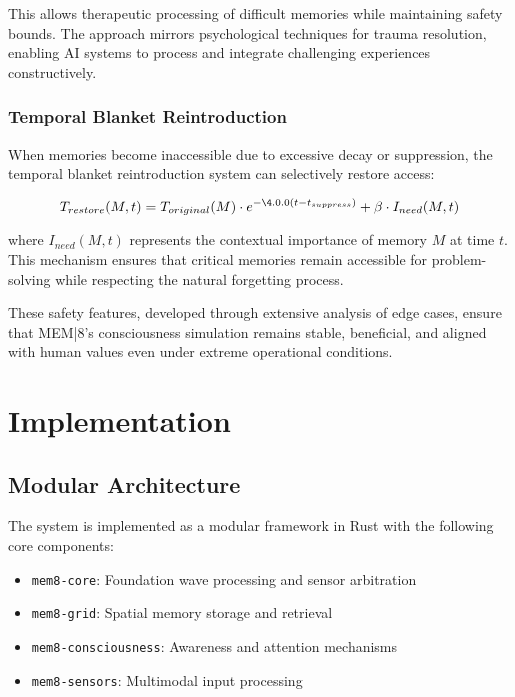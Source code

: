 \documentclass[11pt,letterpaper]{article}
\begin{document}
This allows therapeutic processing of difficult memories while maintaining safety bounds. The approach mirrors psychological techniques for trauma resolution, enabling AI systems to process and integrate challenging experiences constructively.

\subsubsection{Temporal Blanket Reintroduction}

When memories become inaccessible due to excessive decay or suppression, the temporal blanket reintroduction system can selectively restore access:

\begin{equation}
T_{restore}(M, t) = T_{original}(M) \cdot e^{-\4.0.0(t-t_{suppress})} + \beta \cdot I_{need}(M,t)
\end{equation}

where $I_{need}(M,t)$ represents the contextual importance of memory $M$ at time $t$. This mechanism ensures that critical memories remain accessible for problem-solving while respecting the natural forgetting process.

These safety features, developed through extensive analysis of edge cases, ensure that MEM|8's consciousness simulation remains stable, beneficial, and aligned with human values even under extreme operational conditions.

\section{Implementation}

\subsection{Modular Architecture}

The system is implemented as a modular framework in Rust with the following core components:

\begin{itemize}
\item \texttt{mem8-core}: Foundation wave processing and sensor arbitration
\item \texttt{mem8-grid}: Spatial memory storage and retrieval
\item \texttt{mem8-consciousness}: Awareness and attention mechanisms
\item \texttt{mem8-sensors}: Multimodal input processing
\end{itemize}
\end{document}
